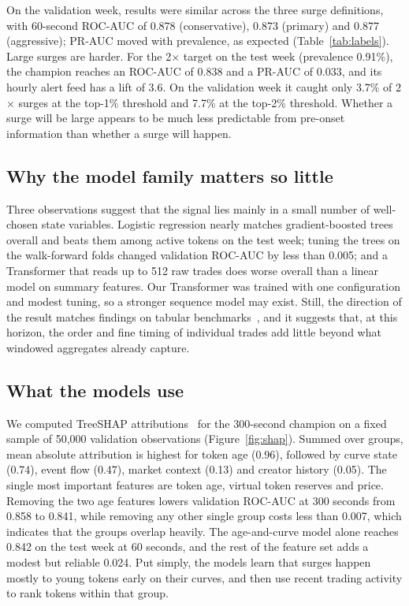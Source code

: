On the validation week, results were similar across the three surge definitions, with 60-second ROC-AUC of 0.878 (conservative), 0.873 (primary) and 0.877 (aggressive); PR-AUC moved with prevalence, as expected (Table~\ref{tab:labels}). Large surges are harder. For the 2$\times$ target on the test week (prevalence 0.91\%), the champion reaches an ROC-AUC of 0.838 and a PR-AUC of 0.033, and its hourly alert feed has a lift of 3.6. On the validation week it caught only 3.7\% of 2$\times$ surges at the top-1\% threshold and 7.7\% at the top-2\% threshold. Whether a surge will be large appears to be much less predictable from pre-onset information than whether a surge will happen.

\begin{table}[t]
\centering
\caption{Sensitivity to the surge definition (validation week) and results for the 2$\times$ target.}
\label{tab:labels}
\tabsize

\end{table}

\subsection{Why the model family matters so little}

Three observations suggest that the signal lies mainly in a small number of well-chosen state variables. Logistic regression nearly matches gradient-boosted trees overall and beats them among active tokens on the test week; tuning the trees on the walk-forward folds changed validation ROC-AUC by less than 0.005; and a Transformer that reads up to 512 raw trades does worse overall than a linear model on summary features. Our Transformer was trained with one configuration and modest tuning, so a stronger sequence model may exist. Still, the direction of the result matches findings on tabular benchmarks~\citep{grinsztajn2022tree,shwartzziv2022tabular,mcelfresh2023neural}, and it suggests that, at this horizon, the order and fine timing of individual trades add little beyond what windowed aggregates already capture.

\subsection{What the models use}

We computed TreeSHAP attributions~\citep{lundberg2020trees} for the 300-second champion on a fixed sample of 50,000 validation observations (Figure~\ref{fig:shap}). Summed over groups, mean absolute attribution is highest for token age (0.96), followed by curve state (0.74), event flow (0.47), market context (0.13) and creator history (0.05). The single most important features are token age, virtual token reserves and price. Removing the two age features lowers validation ROC-AUC at 300 seconds from 0.858 to 0.841, while removing any other single group costs less than 0.007, which indicates that the groups overlap heavily. The age-and-curve model alone reaches 0.842 on the test week at 60 seconds, and the rest of the feature set adds a modest but reliable 0.024. Put simply, the models learn that surges happen mostly to young tokens early on their curves, and then use recent trading activity to rank tokens within that group.

